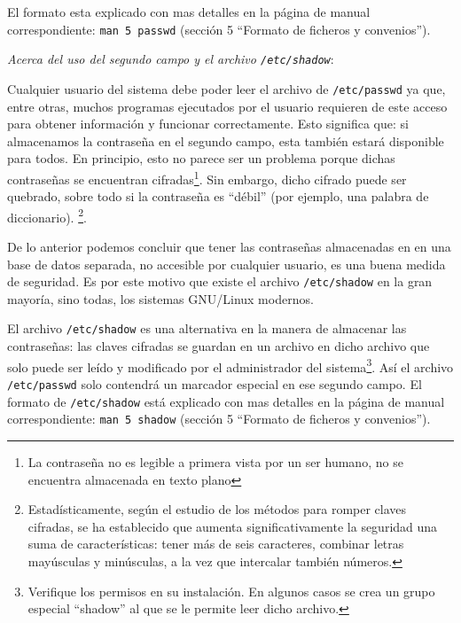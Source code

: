 \documentclass[12pt]{article}
\begin{document}
El formato esta explicado con mas detalles en la página de manual correspondiente: 
\texttt{man 5 passwd} (sección 5 ``Formato de ficheros y convenios'').

\textit{Acerca del uso del segundo campo y el archivo \texttt{/etc/shadow}}: 

Cualquier usuario del sistema debe poder leer el archivo de \texttt{/etc/passwd}
ya que, entre otras, muchos programas ejecutados por el usuario requieren de este acceso 
para obtener información y funcionar correctamente. Esto significa que: si almacenamos 
la contraseña en el segundo campo, esta también estará disponible para todos. En principio, 
esto no parece ser un problema porque dichas contraseñas se encuentran cifradas\footnote{La 
contraseña no es legible a primera vista por un ser humano, no se encuentra almacenada en 
texto plano}.  
Sin embargo, dicho cifrado puede ser quebrado, sobre todo si la contraseña es ``débil'' (por ejemplo, 
una palabra de diccionario).  \footnote{Estadísticamente, según el estudio de
los métodos para romper claves cifradas, se ha establecido que aumenta
significativamente la seguridad una suma de características: tener más de seis
caracteres, combinar letras mayúsculas y minúsculas, a la vez que intercalar
también números.}. 



De lo anterior podemos concluir que tener las contraseñas almacenadas en 
en una base de datos separada, 
no accesible por cualquier usuario, es una buena medida de seguridad. Es por este motivo 
que existe el archivo \texttt{/etc/shadow} en la gran mayoría, sino todas, los sistemas
GNU/Linux modernos.  

El archivo \texttt{/etc/shadow} es una alternativa en la manera de
almacenar las contraseñas: las claves cifradas se guardan en un archivo
en dicho archivo que solo puede ser leído y modificado por el administrador del 
sistema\footnote{Verifique los permisos en su instalación. En algunos casos se crea 
un grupo especial ``shadow'' al que se le permite leer dicho archivo.}. Así el 
archivo \texttt{/etc/passwd} solo contendrá un marcador especial en ese segundo campo. 
El formato de \texttt{/etc/shadow} está explicado con mas detalles en la página de 
manual correspondiente: \texttt{man 5 shadow} (sección 5 ``Formato de ficheros y convenios'').
\end{document}
